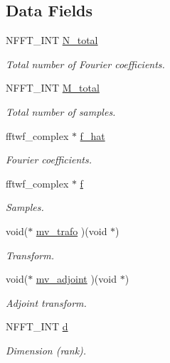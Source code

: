 \subsection*{Data Fields}
\begin{DoxyCompactItemize}
\item 
N\-F\-F\-T\-\_\-\-I\-N\-T \hyperlink{structnfftf__plan_ad864531004111d20cd0c817e2a0afc7d}{N\-\_\-total}
\begin{DoxyCompactList}\small\item\em Total number of Fourier coefficients. \end{DoxyCompactList}\item 
N\-F\-F\-T\-\_\-\-I\-N\-T \hyperlink{structnfftf__plan_afbac491ae6584ac676a576ceb681810a}{M\-\_\-total}
\begin{DoxyCompactList}\small\item\em Total number of samples. \end{DoxyCompactList}\item 
fftwf\-\_\-complex $\ast$ \hyperlink{structnfftf__plan_aa967453b5ae5ba9e5b2056c884d2cda5}{f\-\_\-hat}
\begin{DoxyCompactList}\small\item\em Fourier coefficients. \end{DoxyCompactList}\item 
fftwf\-\_\-complex $\ast$ \hyperlink{structnfftf__plan_a1c2e419705d6254801134bffe0695ae1}{f}
\begin{DoxyCompactList}\small\item\em Samples. \end{DoxyCompactList}\item 
void($\ast$ \hyperlink{structnfftf__plan_ab09b1d93f60895791076e1e41241ecb0}{mv\-\_\-trafo} )(void $\ast$)
\begin{DoxyCompactList}\small\item\em Transform. \end{DoxyCompactList}\item 
void($\ast$ \hyperlink{structnfftf__plan_a9f8b111e42ef7ba609879d4a6983695d}{mv\-\_\-adjoint} )(void $\ast$)
\begin{DoxyCompactList}\small\item\em Adjoint transform. \end{DoxyCompactList}\item 
N\-F\-F\-T\-\_\-\-I\-N\-T \hyperlink{structnfftf__plan_a7408c047e046ca38493625bb60513849}{d}
\begin{DoxyCompactList}\small\item\em Dimension (rank). \end{DoxyCompactList}\item 

\end{DoxyCompactItemize}
